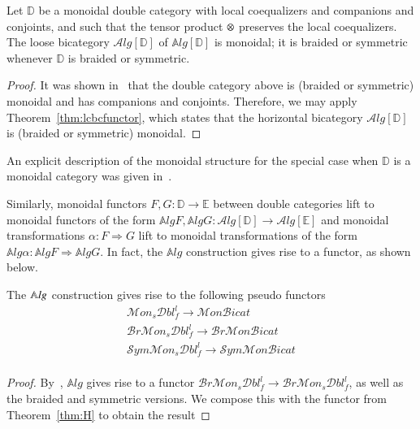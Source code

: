\begin{prop}\label{thm:eqcomp}
Let $\mathbb{D}$ be a monoidal double category with local coequalizers and companions and conjoints, and such that the tensor product $\otimes$ preserves the local coequalizers. The loose bicategory $\mathcal{A}lg[\mathbb{D}]$ of $\mathbb{A}lg[\mathbb{D}]$ is monoidal; it is braided or symmetric whenever $\mathbb{D}$ is braided or symmetric.
\end{prop}

\begin{proof}
It was shown in~\cite[]{shulman:frbi} that the double category above is (braided or symmetric) monoidal and has companions and conjoints. Therefore, we may apply Theorem~\ref{thm:lcbcfunctor}, which states that the horizontal bicategory $\mathcal{A}lg[\mathbb{D}]$ is (braided or symmetric) monoidal.
\end{proof}


An explicit description of the monoidal structure for the special case when ${\mathbb{D}}$ is a monoidal category was given in~\cite{westerthesis}. 

Similarly, monoidal functors $F,G:\mathbb{D} \rightarrow \mathbb{E}$ between double categories lift to monoidal functors of the form $\mathbb{A}lgF,\mathbb{A}lgG: \mathcal{A}lg[\mathbb{D}] \rightarrow \mathcal{A}lg[\mathbb{E}]$ and monoidal transformations $\alpha: F \Rightarrow G$ lift to monoidal transformations of the form $\mathbb{A}lg\alpha: \mathbb{A}lgF \Rightarrow \mathbb{A}lgG$. In fact, the $\mathbb{A}lg$ construction gives rise to a functor, as shown below. 

\begin{prop}\label{prop:funcAlg}
The $\mathbb{A}\mathit{lg}$ construction gives rise to the following pseudo functors
\begin{align*}
\mathcal{M}on_s\mathcal{D}bl^l _f\rightarrow \mathcal{M}on\mathcal{B}icat\\
\mathcal{B}r\mathcal{M}on_s\mathcal{D}bl^l_f \rightarrow \mathcal{B}r\mathcal{M}on\mathcal{B}icat\\
\mathcal{S}ym\mathcal{M}on_s\mathcal{D}bl^l_f \rightarrow \mathcal{S}ym\mathcal{M}on\mathcal{B}icat\\
\end{align*}
\end{prop}

\begin{proof}
By~\cite[Proposition11.22]{shulman:frbi}, $\mathbb{A}lg$ gives rise to a functor $\mathcal{B}r\mathcal{M}on_s\mathcal{D}bl_f^l \rightarrow \mathcal{B}r\mathcal{M}on_s \mathcal{D}bl_f^l$, as well as the braided and symmetric versions. We compose this with the functor from Theorem~\ref{thm:H} to obtain the result
\end{proof}

